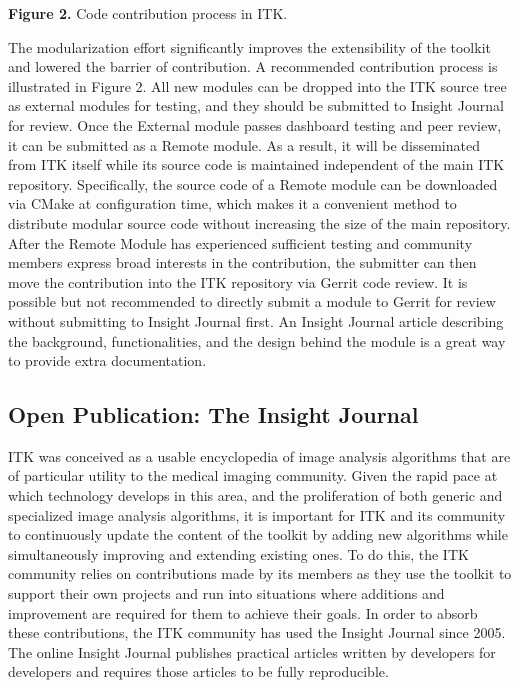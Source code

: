 \documentclass{frontiersENG} %
\begin{document}
\textbf{Figure 2. }{Code contribution process in ITK.}\label{fig:02}

The modularization effort significantly improves the extensibility of the
toolkit and lowered the barrier of contribution. A recommended contribution
process is illustrated in Figure 2.  All new modules can be dropped
into the ITK source tree as external modules for testing, and they should be
submitted to Insight Journal for review. Once the External module passes
dashboard testing and peer review, it can be submitted as a Remote module. As
a result, it will be disseminated from ITK itself while its source code is
maintained independent of the main ITK repository. Specifically, the source
code of a Remote module can be downloaded via CMake at configuration
time, which makes it a convenient method to distribute modular source code
without increasing the size of the main repository. After the Remote Module
has experienced sufficient testing and community members express broad
interests in the contribution, the submitter can then move the contribution
into the ITK repository via Gerrit code review.  It is possible but not
recommended to directly submit a module to Gerrit for review without
submitting to Insight Journal first. An Insight Journal article describing the
background, functionalities, and the design behind the module is a great way
to provide extra documentation.


\subsection{Open Publication: The Insight Journal}
ITK was conceived as a usable encyclopedia of image analysis algorithms
that are of particular utility to the medical imaging community. Given the
rapid pace at which technology develops in this area, and the proliferation of
both generic and specialized image analysis algorithms, it is important for ITK
and its community to continuously update the content of the toolkit by adding
new algorithms while simultaneously improving and extending existing ones. To
do this, the ITK community relies on contributions made by its members as they
use the toolkit to support their own projects and run into situations where
additions and improvement are required for them to achieve their goals. In
order to absorb these contributions, the ITK community has used the Insight
Journal \cite{InsightJournal} since 2005. The online Insight Journal
publishes practical articles written by developers for developers and requires
those articles to be fully reproducible.
\end{document}
